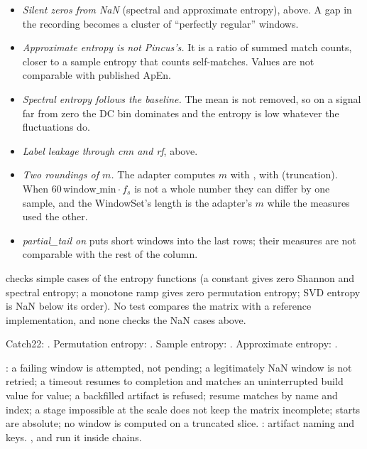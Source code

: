 \begin{itemize}
\item \emph{Silent zeros from NaN} (spectral and approximate entropy), above. A gap in the
  recording becomes a cluster of ``perfectly regular'' windows.
\item \emph{Approximate entropy is not Pincus's.} It is a ratio of summed match counts, closer
  to a sample entropy that counts self-matches. Values are not comparable with published ApEn.
\item \emph{Spectral entropy follows the baseline.} The mean is not removed, so on a signal far
  from zero the DC bin dominates and the entropy is low whatever the fluctuations do.
\item \emph{Label leakage through cnn and rf}, above.
\item \emph{Two roundings of $m$.} The adapter computes $m$ with ,
   with  (truncation). When $60\,\text{window\_min}\cdot
  f_s$ is not a whole number they can differ by one sample, and the WindowSet's length is the
  adapter's $m$ while the measures used the other. 
\item \emph{partial\_tail on} puts short windows into the last rows; their measures are not
  comparable with the rest of the column.
\end{itemize}

 checks simple cases of the entropy functions (a constant
gives zero Shannon and spectral entropy; a monotone ramp gives zero permutation entropy; SVD
entropy is NaN below its order). No test compares the matrix with a reference implementation,
and none checks the NaN cases above.

Catch22: \citet{lubba2019catch22}. Permutation entropy: \citet{bandt2002permutation}. Sample
entropy: \citet{richman2000physiological}. Approximate entropy: \citet{pincus1991approximate}.

: a failing window is attempted, not pending; a
legitimately NaN window is not retried; a timeout resumes to completion and matches an
uninterrupted build value for value; a backfilled artifact is refused; resume matches by name
and index; a stage impossible at the scale does not keep the matrix incomplete; starts are
absolute; no window is computed on a truncated slice.
: artifact naming and keys.
,  and
 run it inside chains.
